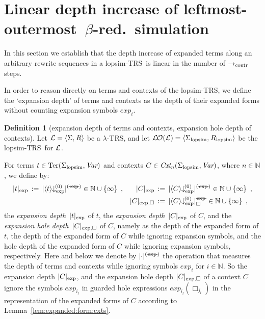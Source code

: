 \documentclass[
submission
]{dmtcs-episciences-tampered}
\newcommand{\fap}[2]{#1({#2})}
\newcommand{\iap}[2]{#1 _{#2}}
\newcommand{\indap}[2]{#1 _{#2}}
\newcommand{\subap}[2]{#1 _{#2}}
\newcommand{\bap}{\subap}
\newcommand{\bpap}[3]{#1 _{#2}^{#3}}
\newcommand{\nb}{\nobreakdash}
\newcommand{\nf}{\normalfont}
\newcommand{\sdefdby}{{:=}}
\newcommand{\defdby}{\mathrel{\sdefdby}}
\newcommand{\punc}[1]{\ensuremath{\hspace*{3pt}{#1}}}
\newcommand{\tuple}[1]{\langle #1 \rangle}
\newcommand{\tuplespace}{\hspace*{0.5pt}}
\newcommand{\pair}[2]{\tuple{#1, \tuplespace #2}}
\newcommand{\setexp}[1]{\left\{{#1}\right\}}
\newcommand{\nat}{\mathbb{N}}
\newcommand{\bter}{t}
\newcommand{\asig}{\Sigma}
\newcommand{\asiglopsim}{\indap{\asig}{\scriptlopsim}}
\newcommand{\arules}{R}
\newcommand{\ruleslopsim}{\indap{\arules}{\scriptlopsim}}
\newcommand{\alTRS}{{\cal L}}
\newcommand{\TRS}{TRS}
\newcommand{\stermsover}{\text{\nf Ter}}
\newcommand{\termsover}{\fap{\stermsover}}
\newcommand{\scontextsover}{\textit{Cxt}}
\newcommand{\scontextsnover}{\bap{\scontextsover}}
\newcommand{\contextsnover}[1]{\fap{\scontextsnover{#1}}}
\newcommand{\vars}{\textit{Var}}
\newcommand{\acxt}{C}
\newcommand{\hole}{\Box}
\newcommand{\holei}{\iap{\hole}}
\newcommand{\expdepth}[1]{\lvert{#1}\rvert_{\scriptexp}}
\newcommand{\expholedepth}[1]{\lvert{#1}\rvert_{\scriptexp,\hole}}
\newcommand{\holedepthnotexp}[1]{\lvert{#1}\rvert_{\hole}^{\scriptnotexp}}
\newcommand{\scriptnotexp}{\text{\sout{\nf\hspace*{1pt}exp\hspace*{1pt}}}}
\newcommand{\depthnotexp}[1]{\lvert{#1}\rvert^{(\scriptnotexp)}}
\newcommand{\lopsimTRS}{lopsim-TRS}
\newcommand{\sred}{\to}
\newcommand{\sredi}{\indap{\sred}}
\newcommand{\scriptlopsim}{\text{\nf lopsim}}
\newcommand{\scriptexp}{\text{\nf exp}}
\newcommand{\scriptcontract}{\text{\nf contr}}
\newcommand{\scontractred}{\sredi{\scriptcontract}}
\newcommand{\sexpand}{\textit{exp}}
\newcommand{\sexpandi}{\indap{\sexpand}}
\newcommand{\expandi}[1]{\fap{\sexpandi{#1}}}
\newcommand{\sexprednfi}[1]{{\bpap{\downarrow}{\scriptexp}{\hspace*{-1pt}(#1)}}}
\newcommand{\exprednfi}[2]{{\langle#2\rangle}\sexprednfi{#1}}
\newcommand{\lo}{left\-most-outer\-most}
\newcommand{\lTRS}{$\lambda$\hspace*{-0.5pt}\nb-\hspace*{-0.5pt}\TRS}
\theoremstyle{plain}
\theoremstyle{definition}
\newtheorem{definition}[theorem]{Definition}
\begin{document}
\section{Linear depth increase of \lo\ $\beta$-red.\ simulation}
  \label{sec:depth:increase}


In this section we establish that the depth increase of expanded terms
along an arbitrary rewrite sequences in a \lopsimTRS\ is linear in the number of $\scontractred$ steps.

In order to reason directly on terms and contexts of the \lopsimTRS, we define
the `expansion depth' of terms and contexts as the depth of their expanded forms without counting expansion symbols $\sexpandi{i}$. 

\begin{definition}[expansion depth of terms and contexts, expansion hole depth of contexts]
  Let $\alTRS = \pair{\asig}{\arules}$ be a \lTRS, 
  and let $\lopsimTRSwrt{\alTRS} = \pair{\asiglopsim}{\ruleslopsim}$ be the \lopsimTRS\ for $\alTRS$. 
  
  For terms $\bter\in\termsover{\asiglopsim,\vars}$ 
  and contexts $\acxt\in\contextsnover{n}{\asiglopsim,\vars}$, where $n\in\nat$,
  we define by:
  \begin{align*}
    \expdepth{\bter} 
      & {} \,\defdby\,
    \depthnotexp{ \exprednfi{0}{\bter} } \in\nat\cup\setexp{\infty} \punc{,}
    & 
    \expdepth{\acxt} 
      & {} \,\defdby\,
    \depthnotexp{ \exprednfi{0}{\acxt} } \in\nat\cup\setexp{\infty} \punc{,}
    \\
    & & 
    \expholedepth{\acxt} 
      & {} \,\defdby\,
    \holedepthnotexp{ \exprednfi{0}{\acxt} } \in\nat\cup\setexp{\infty} \punc{,}
  \end{align*}
  the \emph{expansion depth}~$\expdepth{\bter}$ of $\bter$, 
  the \emph{expansion depth}~$\expdepth{\acxt}$ of $\acxt$,
  and the \emph{expansion hole depth}~$\expholedepth{\acxt}$ of $\acxt$,
  namely 
  as the depth of the expanded form of $\bter$, 
     the depth of the expanded form of $\acxt$ while ignoring expansion symbols,
  and the hole depth of the expanded form of $\acxt$ while ignoring expansion symbols, respectively. 
  Here and below we denote by $\depthnotexp{\cdot}$ the operation that measures the depth
  of terms and contexts while ignoring symbols $\sexpandi{i}$ for $i\in\nat$.
  So the expansion depth $\expdepth{\acxt}$, and the expansion hole depth $\expholedepth{\acxt}$ of a context $\acxt$
  ignore the symbols $\sexpandi{i_l}$ in guarded hole expressions $\expandi{i_l}{\holei{j_l}}$ 
  in the representation of the expanded forms of $\acxt$ according to Lemma~\ref{lem:expanded:form:cxts}.
\end{definition}
\end{document}
